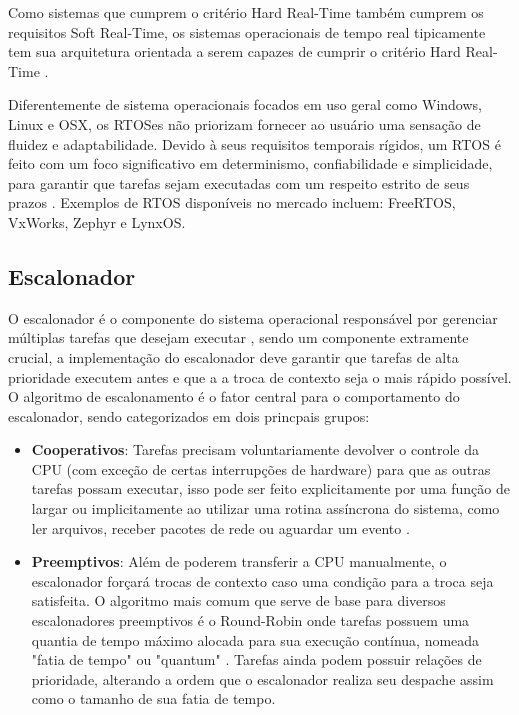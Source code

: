 Como sistemas que cumprem o critério Hard Real-Time também cumprem os requisitos Soft Real-Time, os sistemas operacionais de tempo real tipicamente tem sua arquitetura orientada a serem capazes de cumprir o critério Hard Real-Time  \cite{SchedAndOptOfDistributedFT}.

Diferentemente de sistema operacionais focados em uso geral como Windows, Linux e OSX, os RTOSes não priorizam fornecer ao usuário uma sensação de fluidez e adaptabilidade. Devido à seus requisitos temporais rígidos, um RTOS é feito com um foco significativo em determinismo, confiabilidade e simplicidade, para garantir que tarefas sejam executadas com um respeito estrito de seus prazos \cite{OperatingSystemConcepts}. Exemplos de RTOS disponíveis no mercado incluem: FreeRTOS, VxWorks, Zephyr e LynxOS.

\subsection{Escalonador}

O escalonador é o componente do sistema operacional responsável por gerenciar múltiplas tarefas que desejam executar \cite{OperatingSystemConcepts}, sendo um componente extramente crucial, a implementação do escalonador deve garantir que tarefas de alta prioridade executem antes e que a a troca de contexto seja o mais rápido possível. O algoritmo de escalonamento é o fator central para o comportamento do escalonador, sendo categorizados em dois princpais grupos:

\begin{itemize}
    \item \textbf{Cooperativos}: Tarefas precisam voluntariamente devolver o controle da CPU (com exceção de certas interrupções de hardware) para que as outras tarefas possam executar, isso pode ser feito explicitamente por uma função de largar ou implicitamente ao utilizar uma rotina assíncrona do sistema, como ler arquivos, receber pacotes de rede ou aguardar um evento \cite{OperatingSystemConcepts}.

    \item \textbf{Preemptivos}: Além de poderem transferir a CPU manualmente, o escalonador forçará trocas de contexto caso uma condição para a troca seja satisfeita. O algoritmo mais comum que serve de base para diversos escalonadores preemptivos é o Round-Robin onde tarefas possuem uma quantia de tempo máximo alocada para sua execução contínua, nomeada "fatia de tempo" ou "quantum" \cite{ModernOperatingSystems}. Tarefas ainda podem possuir relações de prioridade, alterando a ordem que o escalonador realiza seu despache assim como o tamanho de sua fatia de tempo.
\end{itemize}

